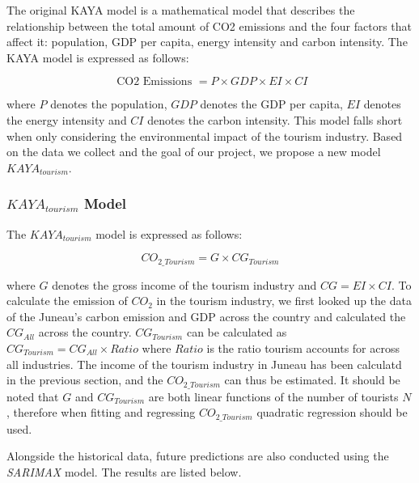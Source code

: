The original KAYA model is a mathematical model that 
describes the relationship between the total 
amount of CO2 emissions and the four factors 
that affect it: population, GDP per capita, energy intensity and carbon intensity.
 The KAYA model is expressed as follows:

\begin{equation}
    \text { CO2 Emissions }=P \times GDP \times E I \times C I
\end{equation}

where $P$ denotes the population, $GDP$ denotes the GDP per capita, 
$EI$ denotes the energy intensity and $CI$ denotes the carbon intensity.
This model falls short when only considering the environmental impact of the tourism industry.
Based on the data we collect and the goal of our project, we propose a new model $KAYA_{tourism}$.


\subsubsection{$KAYA_{tourism}$ Model}

The $KAYA_{tourism}$ model is expressed as follows:

\begin{equation}
    CO_{2\_Tourism}=G \times CG_{Tourism}
\end{equation}

where $G$ denotes the gross income of the tourism industry and $CG = EI \times CI$. To calculate 
the emission of $CO_2$ in the tourism industry, we first looked up the data of the Juneau's carbon emission and
GDP across the country and calculated the $CG_{All}$ across the country. $CG_{Tourism}$ can 
be calculated as $CG_{Tourism} = CG_{All} \times Ratio $  where $Ratio$ is the 
ratio tourism accounts for across all industries. The income of the tourism industry in Juneau 
has been calculatd in the previous section, and the $CO_{2\_Tourism}$ can thus be estimated.
It should be noted that $G$ and $CG_{Tourism}$ are both linear functions of the number of tourists $N$,
therefore when fitting and regressing $CO_{2\_Tourism}$ quadratic regression should be used.

Alongside the historical data, future predictions are also conducted using the \textit{SARIMAX} model.
The results are listed below.

